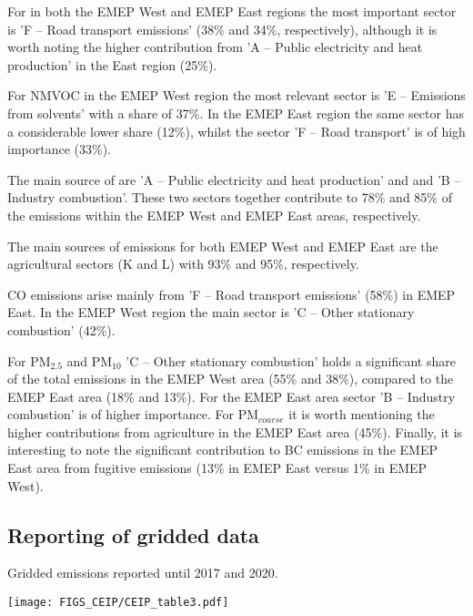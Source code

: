 For \nox in both the EMEP West and EMEP East regions the most important sector is 'F -- Road transport emissions' (38\% and 34\%, respectively), although it is worth noting the higher contribution from  'A -- Public electricity and heat production'  in the East region (25\%).

For NMVOC in the EMEP West region the most relevant sector is 'E -- Emissions from solvents' with a share of 37\%. In the EMEP East region the same sector has a considerable lower share  (12\%), whilst the sector 'F -- Road transport' is of high importance (33\%).

The main source of \sox are 'A -- Public electricity and heat production'  and and 'B -- Industry combustion'. These two sectors together contribute to 78\% and 85\%  of the \sox emissions within the EMEP West and EMEP East areas, respectively.

The main sources of \nhiii emissions for both EMEP West and EMEP East are the
agricultural sectors (K and L) with 93\% and 95\%, respectively.

CO emissions arise mainly from 'F -- Road transport emissions' (58\%) in EMEP East. In the EMEP West region the main sector is 'C -- Other stationary combustion' (42\%).

For PM$_{2.5}$ and PM$_{10}$ 'C -- Other stationary combustion' holds a 
significant share of the total emissions in the EMEP West area (55\% and 38\%), compared to the EMEP East area (18\% and 13\%). For the
EMEP East area sector 'B -- Industry combustion' is of higher importance. For PM$_{coarse}$ it is worth mentioning the higher contributions from agriculture in the EMEP East area (45\%). Finally, it is interesting to note the significant contribution to BC emissions in the EMEP East area from fugitive emissions (13\% in EMEP East versus 1\% in EMEP West). 



\subsection{Reporting of gridded data}

\begin{table} 
  \caption{Gridded emissions reported until 2017 and 2020.}
\centering
{\texttt{[image: FIGS\_CEIP/CEIP\_table3.pdf]}}
\label{tab:emis01degreported}  
\end{table}

